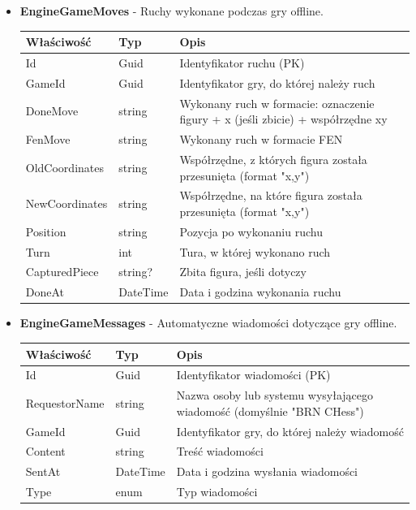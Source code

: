 \documentclass[12pt,a4paper]{article}
\begin{document}
\begin{itemize}
    \item \textbf{EngineGameMoves} - Ruchy wykonane podczas gry offline.
    \begin{longtable}{|m{4cm}|m{2cm}|m{8cm}|}
        \hline
        \textbf{Właściwość} & \textbf{Typ} & \textbf{Opis} \\ \hline
        \endhead
        \hline
        Id & Guid & Identyfikator ruchu (PK) \\ \hline
        GameId & Guid & Identyfikator gry, do której należy ruch \\ \hline
        DoneMove & string & Wykonany ruch w formacie: oznaczenie figury + x (jeśli zbicie) + współrzędne xy \\ \hline
        FenMove & string & Wykonany ruch w formacie FEN \\ \hline
        OldCoordinates & string & Współrzędne, z których figura została przesunięta (format "x,y") \\ \hline
        NewCoordinates & string & Współrzędne, na które figura została przesunięta (format "x,y") \\ \hline
        Position & string & Pozycja po wykonaniu ruchu \\ \hline
        Turn & int & Tura, w której wykonano ruch \\ \hline
        CapturedPiece & string? & Zbita figura, jeśli dotyczy \\ \hline
        DoneAt & DateTime & Data i godzina wykonania ruchu \\ \hline
    \end{longtable}
    
    \item \textbf{EngineGameMessages} - Automatyczne wiadomości dotyczące gry offline.
    \begin{longtable}{|m{4cm}|m{2cm}|m{8cm}|}
        \hline
        \textbf{Właściwość} & \textbf{Typ} & \textbf{Opis} \\ \hline
        \endhead
        \hline
        Id & Guid & Identyfikator wiadomości (PK) \\ \hline
        RequestorName & string & Nazwa osoby lub systemu wysyłającego wiadomość (domyślnie "BRN CHess") \\ \hline
        GameId & Guid & Identyfikator gry, do której należy wiadomość \\ \hline
        Content & string & Treść wiadomości \\ \hline
        SentAt & DateTime & Data i godzina wysłania wiadomości \\ \hline
        Type & enum & Typ wiadomości \\ \hline
    \end{longtable}
    
\end{itemize}
\end{document}
